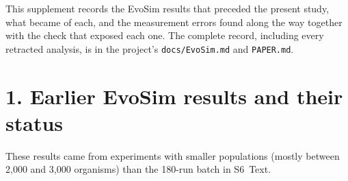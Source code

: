 


This supplement records the EvoSim results that preceded the present study, what
became of each, and the measurement errors found along the way together with the
check that exposed each one. The complete record, including every retracted
analysis, is in the project's \texttt{docs/EvoSim.md} and \texttt{PAPER.md}.

\section*{1. Earlier EvoSim results and their status}
These results came from experiments with smaller populations (mostly between 2{,}000 and 3{,}000 organisms) than the 180-run batch in S6~Text.

